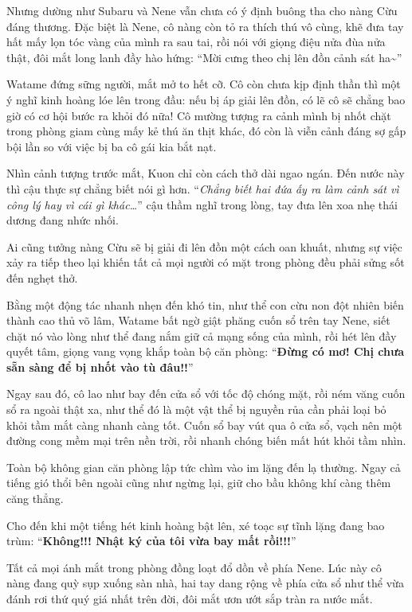 \documentclass[../main.tex]{subfiles}
\begin{document}
Nhưng dường như Subaru và Nene vẫn chưa có ý định buông tha cho nàng Cừu đáng thương. Đặc biệt là Nene, cô nàng còn tỏ ra thích thú vô cùng, khẽ đưa tay hất mấy lọn tóc vàng của mình ra sau tai, rồi nói với giọng điệu nửa đùa nửa thật, đôi mắt long lanh đầy hào hứng: ``Mời cưng theo chị lên đồn cảnh sát ha\~{}''

Watame đứng sững người, mắt mở to hết cỡ. Cô còn chưa kịp định thần thì một ý nghĩ kinh hoàng lóe lên trong đầu: nếu bị áp giải lên đồn, có lẽ cô sẽ chẳng bao giờ có cơ hội bước ra khỏi đó nữa! Cô mường tượng ra cảnh mình bị nhốt chặt trong phòng giam cùng mấy kẻ thú ăn thịt khác, đó còn là viễn cảnh đáng sợ gấp bội lần so với việc bị ba cô gái kia bắt nạt.

Nhìn cảnh tượng trước mắt, Kuon chỉ còn cách thở dài ngao ngán. Đến nước này thì cậu thực sự chẳng biết nói gì hơn. ``\textit{Chẳng biết hai đứa ấy ra làm cảnh sát vì công lý hay vì cái gì khác\dots}'' cậu thầm nghĩ trong lòng, tay đưa lên xoa nhẹ thái dương đang nhức nhối.

Ai cũng tưởng nàng Cừu sẽ bị giải đi lên đồn một cách oan khuất, nhưng sự việc xảy ra tiếp theo lại khiến tất cả mọi người có mặt trong phòng đều phải sửng sốt đến nghẹt thở.

Bằng một động tác nhanh nhẹn đến khó tin, như thể con cừu non đột nhiên biến thành cao thủ võ lâm, Watame bất ngờ giật phăng cuốn sổ trên tay Nene, siết chặt nó vào lòng như thể đang nắm giữ cả mạng sống của mình, rồi hét lên đầy quyết tâm, giọng vang vọng khắp toàn bộ căn phòng: ``\textbf{Đừng có mơ! Chị chưa sẵn sàng để bị nhốt vào tù đâu!!}''

Ngay sau đó, cô lao như bay đến cửa sổ với tốc độ chóng mặt, rồi ném văng cuốn sổ ra ngoài thật xa, như thể đó là một vật thể bị nguyền rủa cần phải loại bỏ khỏi tầm mắt càng nhanh càng tốt. Cuốn sổ bay vút qua ô cửa sổ, vạch nên một đường cong mềm mại trên nền trời, rồi nhanh chóng biến mất hút khỏi tầm nhìn.

Toàn bộ không gian căn phòng lập tức chìm vào im lặng đến lạ thường. Ngay cả tiếng gió thổi bên ngoài cũng như ngừng lại, giữ cho bầu không khí càng thêm căng thẳng.

Cho đến khi một tiếng hét kinh hoàng bật lên, xé toạc sự tĩnh lặng đang bao trùm: ``\textbf{Không!!! Nhật ký của tôi vừa bay mất rồi!!!}''


Tất cả mọi ánh mắt trong phòng đồng loạt đổ dồn về phía Nene. Lúc này cô nàng đang quỳ sụp xuống sàn nhà, hai tay dang rộng về phía cửa sổ như thể vừa đánh rơi thứ quý giá nhất trên đời, đôi mắt ươn ướt sắp tràn ra nước mắt.
\end{document}
